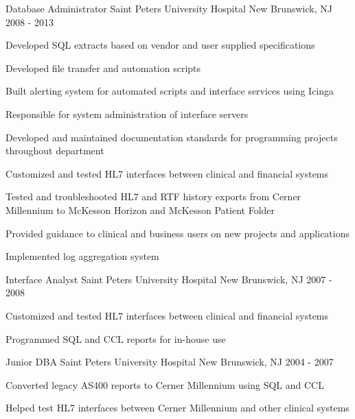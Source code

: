 \begin{cventries}
  \cventry
  {Database Administrator} %
  {Saint Peters University Hospital} %
  {New Brunswick, NJ} %
  {2008 - 2013} %
  {
    \begin{cvitems} %
      \item {Developed SQL extracts based on vendor and user supplied specifications}
      \item {Developed file transfer and automation scripts}
      \item {Built alerting system for automated scripts and interface services using Icinga}
      \item {Responsible for system administration of interface servers}
      \item {Developed and maintained documentation standards for programming projects throughout department}
      \item {Customized and tested HL7 interfaces between clinical and financial systems}
      \item {Tested and troubleshooted HL7 and RTF history exports from Cerner Millennium to McKesson Horizon and McKesson Patient Folder}
      \item {Provided guidance to clinical and business users on new projects and applications}
      \item {Implemented log aggregation system}
    \end{cvitems}
  }

  \cventry
  {Interface Analyst} %
  {Saint Peters University Hospital} %
  {New Brunswick, NJ} %
  {2007 - 2008} %
  {
    \begin{cvitems} %
      \item {Customized and tested HL7 interfaces between clinical and financial systems}
      \item {Programmed SQL and CCL reports for in-house use}
    \end{cvitems}
  }

  \cventry
    {Junior DBA} %
    {Saint Peters University Hospital} %
    {New Brunswick, NJ} %
    {2004 - 2007} %
    {
      \begin{cvitems} %
        \item {Converted legacy AS400 reports to Cerner Millennium using SQL and CCL}
        \item {Helped test HL7 interfaces between Cerner Millennium and other clinical systems}
      \end{cvitems}
    }

\end{cventries}

